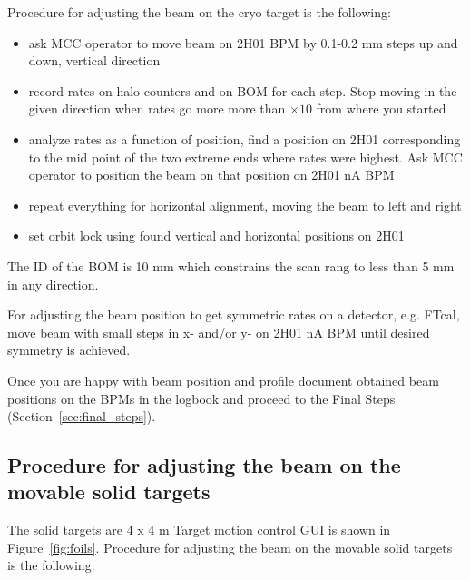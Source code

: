 Procedure for adjusting the beam on the cryo target is the following:
\begin{itemize}
\item ask MCC operator to move beam on 2H01 BPM by 0.1-0.2 mm steps up and down, vertical direction
\item record rates on halo counters and on BOM for each step. Stop moving in the given direction when rates go more more than $\times 10$ from where you started 
\item analyze rates as a function of position, find a position on 2H01 corresponding to the mid point of the two extreme ends where rates were highest. Ask MCC operator to position the beam on that position on 2H01 nA BPM
\item  repeat everything for horizontal alignment, moving the beam to left and right 
\item set orbit lock using found vertical and horizontal positions on 2H01 
\end{itemize}

The ID of the BOM is 10 mm which constrains the scan rang to less than 5 mm in any direction.

For adjusting the beam position to get symmetric rates on a detector, e.g. FTcal, move beam with small steps in x- and/or y- on 2H01 nA BPM until desired symmetry is achieved.  
\vspace{1.cm}

Once you are happy with beam position and profile document obtained beam positions on the BPMs in the logbook and proceed to the Final Steps (Section~\ref{sec:final_steps}).

\subsection{Procedure for adjusting the beam on the movable solid targets} 

The solid targets are 4 x 4 m
Target motion control GUI is shown in Figure~\ref{fig:foils}.
Procedure for adjusting the beam on the movable solid targets is the following:

